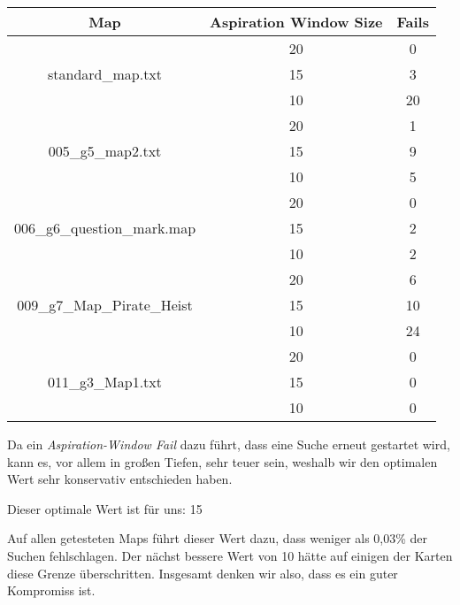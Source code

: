 \begin{tabular}{|c|c|c|}
\hline 
Map & Aspiration Window Size & Fails \\ 
\hline 
\hline
\multirow{3}{*}{standard\_map.txt} & 20 & 0  \\
                                   & 15 & 3  \\ 
                                   & 10 & 20 \\ 
\hline 

\multirow{3}{*}{005\_g5\_map2.txt} & 20 & 1 \\ 
                                   & 15 & 9 \\ 
                                   & 10 & 5 \\ 
\hline 

\multirow{3}{*}{006\_g6\_question\_mark.map} & 20 & 0 \\
                                             & 15 & 2 \\ 
                                             & 10 & 2 \\ 
\hline 

\multirow{3}{*}{009\_g7\_Map\_Pirate\_Heist} & 20 & 6 \\
                                             & 15 & 10 \\ 
                                             & 10 & 24 \\ 
\hline 
 
\multirow{3}{*}{011\_g3\_Map1.txt} & 20 & 0 \\
                                   & 15 & 0 \\ 
                                   & 10 & 0 \\ 
\hline 
\end{tabular} 

Da ein \textit{Aspiration-Window Fail} dazu führt, dass eine Suche erneut gestartet wird, kann es, vor allem in großen Tiefen, sehr teuer sein, weshalb wir den optimalen Wert sehr konservativ entschieden haben. 

Dieser optimale Wert ist für uns: 15

Auf allen getesteten Maps führt dieser Wert dazu, dass weniger als 0,03\% der Suchen fehlschlagen. Der nächst bessere Wert von 10 hätte auf einigen der Karten diese Grenze überschritten. Insgesamt denken wir also, dass es ein guter Kompromiss ist.